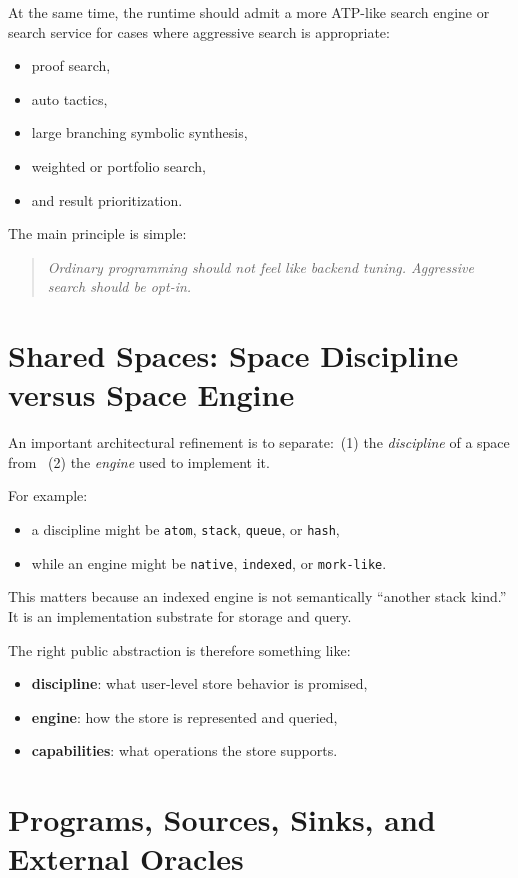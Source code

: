 \documentclass[11pt]{article}
\begin{document}
At the same time, the runtime should admit a more ATP-like search engine or search service for cases where aggressive search is appropriate:
\begin{itemize}[leftmargin=2em]
  \item proof search,
  \item auto tactics,
  \item large branching symbolic synthesis,
  \item weighted or portfolio search,
  \item and result prioritization.
\end{itemize}

The main principle is simple:
\begin{quote}
\emph{Ordinary programming should not feel like backend tuning. Aggressive search should be opt-in.}
\end{quote}

\section{Shared Spaces: Space Discipline versus Space Engine}

An important architectural refinement is to separate:\
(1) the \emph{discipline} of a space from \
(2) the \emph{engine} used to implement it.

For example:
\begin{itemize}[leftmargin=2em]
  \item a discipline might be \texttt{atom}, \texttt{stack}, \texttt{queue}, or \texttt{hash},
  \item while an engine might be \texttt{native}, \texttt{indexed}, or \texttt{mork-like}.
\end{itemize}

This matters because an indexed engine is not semantically ``another stack kind.'' It is an implementation substrate for storage and query.

The right public abstraction is therefore something like:
\begin{itemize}[leftmargin=2em]
  \item \textbf{discipline}: what user-level store behavior is promised,
  \item \textbf{engine}: how the store is represented and queried,
  \item \textbf{capabilities}: what operations the store supports.
\end{itemize}

\section{Programs, Sources, Sinks, and External Oracles}
\end{document}
